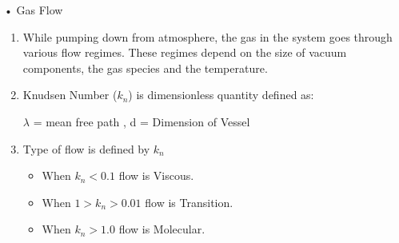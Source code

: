 \documentclass[11]{beamer}
\begin{document}
\begin{frame}{• Gas Flow}

\begin{enumerate}

\item While pumping down from atmosphere, the gas in the system goes through various flow regimes. These regimes depend on the size of vacuum components, the gas species and the temperature.
\item Knudsen Number ($k_{n}$) is dimensionless quantity defined as:         
\begin{center}
\end{center}

 $\lambda$ = mean free path ,  d = Dimension of Vessel

\item Type of flow is defined by $k_{n}$
   \begin{itemize}
   \item When $k_{n}< 0.1$ flow is Viscous.
   \item When $ 1>k_{n}> 0.01 $ flow is Transition.
   \item When $ k_{n}> 1.0 $ flow is Molecular.
   \end{itemize}
   

\end{enumerate}

		


\end{frame}
\end{document}
